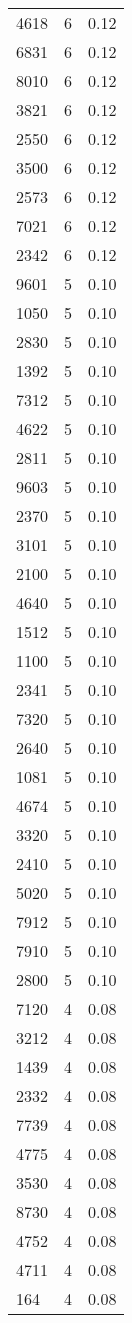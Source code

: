 \begin{table*}[htbp]
\begin{tabular}{lrr}
4618 & 6 & 0.12 \\
6831 & 6 & 0.12 \\
8010 & 6 & 0.12 \\
3821 & 6 & 0.12 \\
2550 & 6 & 0.12 \\
3500 & 6 & 0.12 \\
2573 & 6 & 0.12 \\
7021 & 6 & 0.12 \\
2342 & 6 & 0.12 \\
9601 & 5 & 0.10 \\
1050 & 5 & 0.10 \\
2830 & 5 & 0.10 \\
1392 & 5 & 0.10 \\
7312 & 5 & 0.10 \\
4622 & 5 & 0.10 \\
2811 & 5 & 0.10 \\
9603 & 5 & 0.10 \\
2370 & 5 & 0.10 \\
3101 & 5 & 0.10 \\
2100 & 5 & 0.10 \\
4640 & 5 & 0.10 \\
1512 & 5 & 0.10 \\
1100 & 5 & 0.10 \\
2341 & 5 & 0.10 \\
7320 & 5 & 0.10 \\
2640 & 5 & 0.10 \\
1081 & 5 & 0.10 \\
4674 & 5 & 0.10 \\
3320 & 5 & 0.10 \\
2410 & 5 & 0.10 \\
5020 & 5 & 0.10 \\
7912 & 5 & 0.10 \\
7910 & 5 & 0.10 \\
2800 & 5 & 0.10 \\
7120 & 4 & 0.08 \\
3212 & 4 & 0.08 \\
1439 & 4 & 0.08 \\
2332 & 4 & 0.08 \\
7739 & 4 & 0.08 \\
4775 & 4 & 0.08 \\
3530 & 4 & 0.08 \\
8730 & 4 & 0.08 \\
4752 & 4 & 0.08 \\
4711 & 4 & 0.08 \\
164 & 4 & 0.08 \\

\end{tabular}
\end{table*}
